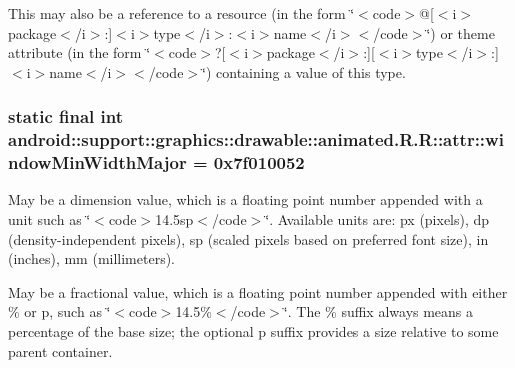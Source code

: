 This may also be a reference to a resource (in the form \char`\"{}$<$code$>$@\mbox{[}$<$i$>$package$<$/i$>$:\mbox{]}$<$i$>$type$<$/i$>$:$<$i$>$name$<$/i$>$$<$/code$>$\char`\"{}) or theme attribute (in the form \char`\"{}$<$code$>$?\mbox{[}$<$i$>$package$<$/i$>$:\mbox{]}\mbox{[}$<$i$>$type$<$/i$>$:\mbox{]}$<$i$>$name$<$/i$>$$<$/code$>$\char`\"{}) containing a value of this type. \hypertarget{classandroid_1_1support_1_1graphics_1_1drawable_1_1animated_1_1_r_1_1attr_ae34e65e0bba26bfd5320612e50a3976}{
\subsubsection[{windowMinWidthMajor}]{\setlength{\rightskip}{0pt plus 5cm}static final int android::support::graphics::drawable::animated.R.R::attr::windowMinWidthMajor = 0x7f010052}}
\label{classandroid_1_1support_1_1graphics_1_1drawable_1_1animated_1_1_r_1_1attr_ae34e65e0bba26bfd5320612e50a3976}


May be a dimension value, which is a floating point number appended with a unit such as \char`\"{}$<$code$>$14.5sp$<$/code$>$\char`\"{}. Available units are: px (pixels), dp (density-independent pixels), sp (scaled pixels based on preferred font size), in (inches), mm (millimeters). 

May be a fractional value, which is a floating point number appended with either \% or p, such as \char`\"{}$<$code$>$14.5\%$<$/code$>$\char`\"{}. The \% suffix always means a percentage of the base size; the optional p suffix provides a size relative to some parent container. 

